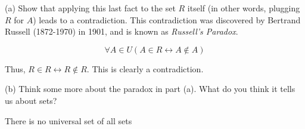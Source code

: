 \documentclass[11pt]{article}
\newcommand{\bicond}{\leftrightarrow}
\begin{document}
\noindent (a) Show that applying this last fact to the set $R$ itself (in other 
words, plugging $R$ for $A$) leads to a contradiction. This contradiction was
discovered by Bertrand Russell (1872-1970) in 1901, and is known as 
\textit{Russell's Paradox}.

$$\forall A \in U (A \in R \bicond A \notin A)$$

Thus, $R \in R \bicond R \notin R$. This is clearly a contradiction.

\noindent (b) Think some more about the paradox in part (a). What do you think 
it tells us about sets?

There is no universal set of all sets
\end{document}
